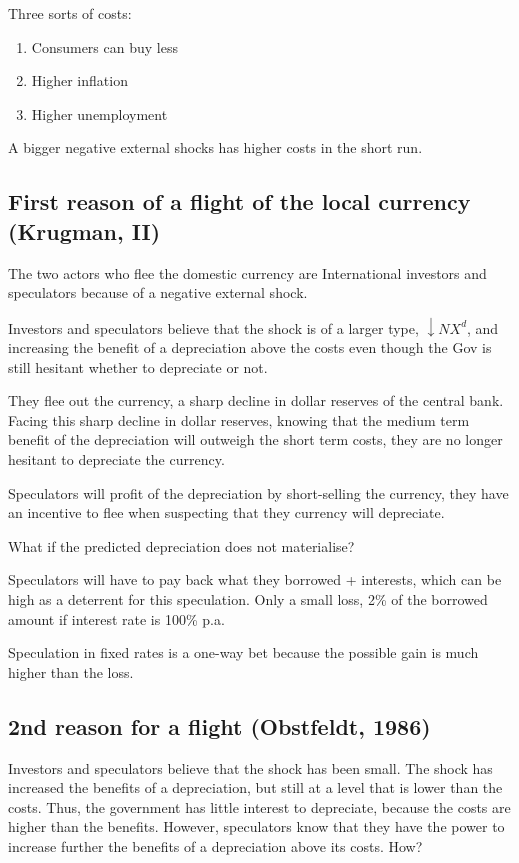 \documentclass{report}
\begin{document}
Three sorts of costs:
\begin{enumerate}
    \item Consumers can buy less
    \item Higher inflation
    \item Higher unemployment
\end{enumerate}


A bigger negative external shocks has higher costs in the short run. 

\subsection{First reason of a flight of the local currency (Krugman, II)}

The two actors who flee the domestic currency are International investors and speculators because of a negative external shock. 

Investors and speculators believe that the shock is of a larger type, $\downarrow NX^d$, and increasing the benefit of a depreciation above the costs even though the Gov is still hesitant whether to depreciate or not. 

They flee out the currency, a sharp decline in dollar reserves of the central bank. Facing this sharp decline in dollar reserves, knowing that the medium term benefit of the depreciation will outweigh the short term costs, they are no longer hesitant to depreciate the currency. 

Speculators will profit of the depreciation by short-selling the currency, they have an incentive to flee when suspecting that they currency will depreciate. 

What if the predicted depreciation does not materialise?

Speculators will have to pay back what they borrowed + interests, which can be high as a deterrent for this speculation. Only a small loss, 2\% of the borrowed amount if interest rate is 100\% p.a. 

Speculation in fixed rates is a one-way bet because the possible gain is much higher than the loss. 

\subsection{2nd reason for a flight (Obstfeldt, 1986)}
Investors and speculators believe that the shock has been small. The shock has increased the benefits of a depreciation, but still at a level that is lower than the costs. Thus, the government has little interest to depreciate, because the costs are higher than the benefits. However, speculators know that they have the power to increase further the benefits of a depreciation above its costs. How?
\end{document}
